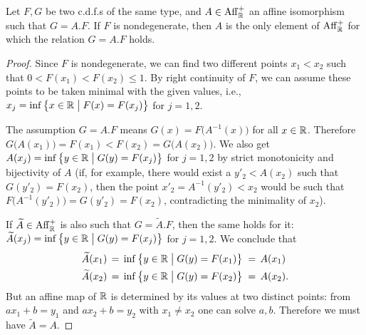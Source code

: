\begin{lemma}
  \label{lem:unique-affine-relation-cdf}
  \leanok
  Let $F, G$ be two c.d.f.s of the same type, and $A \in \mathrm{Aff}^+_{\mathbb{R}}$
  an affine isomorphism such that $G = A.F$. If $F$ is nondegenerate,
  then $A$ is the only element of $\mathrm{Aff}^+_{\mathbb{R}}$ for which the
  relation $G = A.F$ holds.
\end{lemma}
\begin{proof}
  Since $F$ is nondegenerate, we can find two different points $x_1 < x_2$
  such that $0 < F(x_1) < F(x_2) \le 1$. By right continuity of $F$, we can
  assume these points to be taken minimal with the given values, i.e.,
  $x_j = \inf \big\{ x \in \mathbb{R} \; \big| \; F(x) = F(x_j) \big\}$ for
  $j=1,2$.

  The assumption $G = A.F$ means $G(x) = F \big( A^{-1}(x) \big)$ for all $x \in \mathbb{R}$.
  Therefore $G \big( A(x_1) \big) = F(x_1) < F(x_2) = G \big( A(x_2) \big)$.
  We also get $A(x_j) = \inf \big\{ y \in \mathbb{R} \; \big| \; G(y) = F(x_j) \big\}$ for
  $j=1,2$ by strict monotonicity and bijectivity of $A$
  (if, for example, there would exist a $y'_2 < A(x_2)$ such that $G(y'_2) = F(x_2)$,
  then the point $x'_2 = A^{-1}(y'_2) < x_2$ would be such that
  $F\big(A^{-1}(y'_2)\big) = G(y'_2) = F(x_2)$, contradicting the minimality of $x_2$).

  If $\widetilde{A} \in \mathrm{Aff}^+_{\mathbb{R}}$ is also such that $G = \widetilde{A}.F$, then
  the same holds for it:
  $\widetilde{A}(x_j) = \inf \big\{ y \in \mathbb{R} \; \big| \; G(y) = F(x_j) \big\}$
  for $j=1,2$. We conclude that
  \begin{align*}
    \widetilde{A}(x_1) \, = \; &
        \inf \big\{ y \in \mathbb{R} \; \big| \; G(y) = F(x_1) \big\} \; = \, A(x_1) \\
    \widetilde{A}(x_2) \, = \; &
        \inf \big\{ y \in \mathbb{R} \; \big| \; G(y) = F(x_2) \big\} \; = \, A(x_2) .
  \end{align*}
  But an affine map of $\mathbb{R}$ is determined by its values at two distinct points:
  from $a x_1 + b = y_1$ and $a x_2 + b = y_2$ with $x_1 \ne x_2$ one can solve $a, b$.
  Therefore we must have $\widetilde{A} = A$.
\end{proof}

